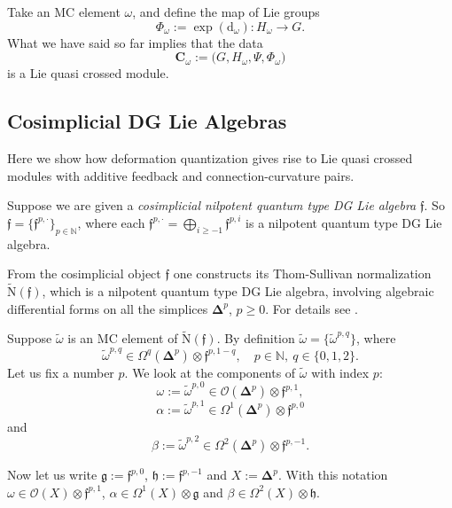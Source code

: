 \documentclass[10pt, a4paper]{amsart}
\theoremstyle{definition}
\numberwithin{equation}{section}
\newcommand{\bdot}{\bsym{\cdot}}
\newcommand{\mfrak}[1]{\mathfrak{#1}}
\newcommand{\mcal}[1]{\mathcal{#1}}
\newcommand{\mbf}[1]{\mathbf{#1}}
\newcommand{\mrm}[1]{\mathrm{#1}}
\newcommand{\mbb}[1]{\mathbb{#1}}
\newcommand{\bsym}[1]{\boldsymbol{#1}}
\newcommand{\boplus}{\bigoplus\nolimits}
\newcommand{\til}[1]{\tilde{#1}}
\newcommand{\N}{\mbb{N}}
\newcommand{\g}{\mfrak{g}}
\newcommand{\h}{\mfrak{h}}
\newcommand{\f}{\mfrak{f}}
\renewcommand{\d}{\mrm{d}}
\newcommand{\lb}{\linebreak}
\begin{document}
Take an MC element $\omega$, and define the map of Lie groups
\[ \Phi_{\omega} := \exp(\d_{\omega}) : H_{\omega} \to G . \]
What we have said so far implies that the data
\begin{equation} \label{eqn:125}
\mbf{C}_{\omega} := \bigl( G, H_{\omega}, \Psi, \Phi_{\omega} \bigr)
\end{equation}
is a Lie quasi crossed module. 

\subsection{Cosimplicial DG Lie Algebras} \label{subsec:CosDGLie}
Here we show how deformation quantization gives rise to Lie quasi \lb crossed
modules with additive feedback and con\-nection-curvature pairs. 

Suppose we are given a {\em cosimplicial nilpotent 
quantum type DG Lie algebra} $\f$. So 
$\f = \{ \f^{p, \bdot} \}_{p \in \N}$,
where each $\f^{p, \bdot} = \boplus_{i \geq -1} \f^{p,i}$
is a nilpotent quantum type DG Lie algebra.

{}From the cosimplicial object $\f$ one constructs its
Thom-Sullivan normalization $\til{\mrm{N}}(\f)$, which is a nilpotent 
quantum type DG Lie algebra, involving algebraic differential forms on all the
simplices $\bsym{\Delta}^p$, $p \geq 0$. For details see \cite[Section 2]{Ye2}.

Suppose $\til{\omega}$ is an MC element of
$\til{\mrm{N}}(\f)$. By definition 
$\til{\omega} = \{ \til{\omega}^{p, q} \}$, where
\[ \til{\omega}^{p, q} \in \Omega^q(\bsym{\Delta}^p) 
\otimes \f^{p, 1 - q} , \quad p \in \N,\ q \in \{ 0, 1, 2 \} .  \]
Let us fix a number $p$. We look at the components of $\til{\omega}$ with index
$p$:
\[ \omega := \til{\omega}^{p, 0} \in 
\mcal{O}(\bsym{\Delta}^p) \otimes \f^{p, 1} , \]
\[ \alpha := \til{\omega}^{p, 1} \in 
\Omega^1(\bsym{\Delta}^p) \otimes \f^{p, 0}  \]
and
\[ \beta := \til{\omega}^{p, 2} \in 
\Omega^2(\bsym{\Delta}^p) \otimes \f^{p, -1} . \]

Now let us write
$\g := \f^{p, 0}$, $\h := \f^{p, -1}$ and $X := \bsym{\Delta}^p$.
With this notation 
$\omega \in \mcal{O}(X) \otimes \f^{p, 1}$,
$\alpha \in \Omega^1(X) \otimes \g$
and
$\beta \in \Omega^2(X) \otimes \h$.
\end{document}
